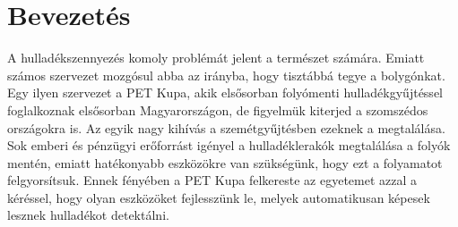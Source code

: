 \chapter{Bevezetés}
\label{ch:intro}

A hulladékszennyezés komoly problémát jelent a természet számára. Emiatt számos szervezet mozgósul abba az irányba, hogy tisztábbá tegye a bolygónkat. Egy ilyen szervezet a PET Kupa, akik elsősorban folyómenti hulladékgyűjtéssel foglalkoznak elsősorban Magyarországon, de figyelmük kiterjed a szomszédos országokra is. Az egyik nagy kihívás a szemétgyűjtésben ezeknek a megtalálása. Sok emberi és pénzügyi erőforrást igényel a hulladéklerakók megtalálása a folyók mentén, emiatt hatékonyabb eszközökre van szükségünk, hogy ezt a folyamatot felgyorsítsuk. Ennek fényében a PET Kupa felkereste az egyetemet azzal a kéréssel, hogy olyan eszközöket fejlesszünk le, melyek automatikusan képesek lesznek hulladékot detektálni.

